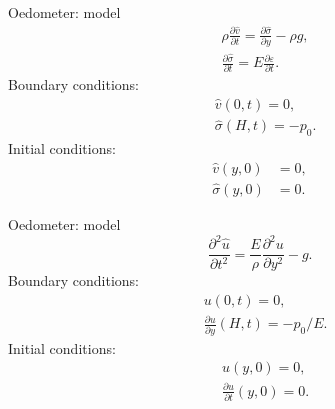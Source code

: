 \documentclass{beamer}
\begin{document}
\begin{frame}{Oedometer: model}
\begin{align}\nonumber
 &\rho \frac{\partial \hat{v}}{\partial t} = \frac{\partial \hat{\sigma}}{\partial y} - \rho g, \\ \nonumber
 &\frac{\partial \hat{\sigma}}{\partial t} = E \frac{\partial \varepsilon}{\partial t}.
\end{align}
Boundary conditions: 
\begin{align} \nonumber
 &\hat{v}(0,t)  = 0,\\ \nonumber
 &\hat{\sigma}(H,t)  = -p_0.
\end{align}
Initial conditions:
\begin{align} \nonumber
 \hat{v}(y,0)&=0,\\ \nonumber
 \hat{\sigma}(y,0)&=0.
\end{align}
\end{frame}

\begin{frame}{Oedometer: model}
\begin{equation}\nonumber
\frac{\partial^2 \hat{u}}{\partial t^2} = \frac{E}{\rho} \frac{\partial^2 u}{\partial y^2} -  g.
\end{equation}
Boundary conditions: 
\begin{align} \nonumber
 &u(0,t)  = 0,\\ \nonumber
 &\frac{\partial u}{\partial y}(H,t)  = -p_0/E.
\end{align}
Initial conditions:
\begin{align} \nonumber
& u(y,0)=0,\\ \nonumber
& \frac{\partial u}{\partial t}(y,0)=0.
\end{align}
\end{frame}
\end{document}
